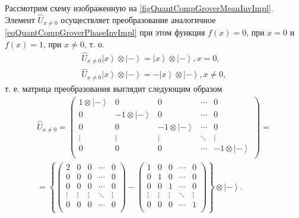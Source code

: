 

Рассмотрим схему изображенную на
\autoref{figQuantCompGroverMeanInvImpl}. Элемент $\hat{U}_{x \ne 0}$
осуществляет преобразование аналогичное
\eqref{eqQuantCompGroverPhaseInvImpl} при этом функция
$f\left(x\right) = 0$, при $x = 0$ и $f\left(x\right) = 1$, при $x \ne
0$, т. о.
\begin{eqnarray}
\hat{U}_{x \ne 0} \left|x\right>\otimes\left|-\right> 
= \left|x\right>\otimes\left|-\right>, x = 0,
\nonumber \\
\hat{U}_{x \ne 0} \left|x\right>\otimes\left|-\right> 
= - \left|x\right>\otimes\left|-\right>, x \ne 0,
\nonumber
\end{eqnarray}
т. е. матрица преобразования выглядит следующим образом
\begin{eqnarray}
\hat{U}_{x \ne 0} = 
\begin{pmatrix}
1 \otimes \left|-\right> & 0 & 0 & \cdots & 0 \\
0 & -1 \otimes \left|-\right>  & 0 & \cdots & 0 \\
0 & 0 & -1 \otimes \left|-\right>   & \cdots & 0 \\
\vdots & \vdots & \vdots & \ddots & \vdots \\
0 & 0 & 0  & \cdots & -1 \otimes \left|-\right>  \\
\end{pmatrix}
=
\nonumber \\
=
\left\{
\begin{pmatrix}
2  & 0 & 0 & \cdots & 0 \\
0 & 0 & 0 & \cdots & 0 \\
0 & 0 & 0 & \cdots & 0 \\
\vdots & \vdots & \vdots & \ddots & \vdots \\
0 & 0 & 0  & \cdots & 0 \\
\end{pmatrix} - 
\begin{pmatrix}
1 & 0 & 0 & \cdots & 0 \\
0 & 1 & 0 & \cdots & 0 \\
0 & 0 & 1 & \cdots & 0 \\
\vdots & \vdots & \vdots & \ddots & \vdots \\
0 & 0 & 0  & \cdots & 1  \\
\end{pmatrix}
\right\}
\otimes \left|-\right> 
. 
\nonumber
\end{eqnarray}

